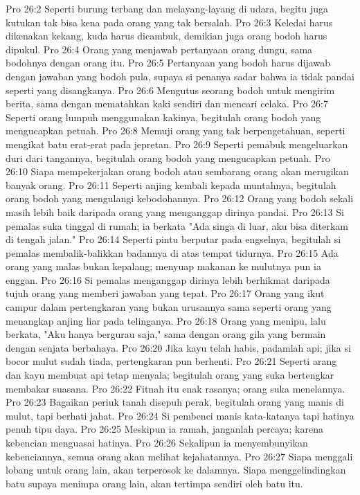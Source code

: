 Pro 26:2  Seperti burung terbang dan melayang-layang di udara, begitu juga kutukan tak bisa kena pada orang yang tak bersalah.
Pro 26:3  Keledai harus dikenakan kekang, kuda harus dicambuk, demikian juga orang bodoh harus dipukul.
Pro 26:4  Orang yang menjawab pertanyaan orang dungu, sama bodohnya dengan orang itu.
Pro 26:5  Pertanyaan yang bodoh harus dijawab dengan jawaban yang bodoh pula, supaya si penanya sadar bahwa ia tidak pandai seperti yang disangkanya.
Pro 26:6  Mengutus seorang bodoh untuk mengirim berita, sama dengan mematahkan kaki sendiri dan mencari celaka.
Pro 26:7  Seperti orang lumpuh menggunakan kakinya, begitulah orang bodoh yang mengucapkan petuah.
Pro 26:8  Memuji orang yang tak berpengetahuan, seperti mengikat batu erat-erat pada jepretan.
Pro 26:9  Seperti pemabuk mengeluarkan duri dari tangannya, begitulah orang bodoh yang mengucapkan petuah.
Pro 26:10  Siapa mempekerjakan orang bodoh atau sembarang orang akan merugikan banyak orang.
Pro 26:11  Seperti anjing kembali kepada muntahnya, begitulah orang bodoh yang mengulangi kebodohannya.
Pro 26:12  Orang yang bodoh sekali masih lebih baik daripada orang yang menganggap dirinya pandai.
Pro 26:13  Si pemalas suka tinggal di rumah; ia berkata "Ada singa di luar, aku bisa diterkam di tengah jalan."
Pro 26:14  Seperti pintu berputar pada engselnya, begitulah si pemalas membalik-balikkan badannya di atas tempat tidurnya.
Pro 26:15  Ada orang yang malas bukan kepalang; menyuap makanan ke mulutnya pun ia enggan.
Pro 26:16  Si pemalas menganggap dirinya lebih berhikmat daripada tujuh orang yang memberi jawaban yang tepat.
Pro 26:17  Orang yang ikut campur dalam pertengkaran yang bukan urusannya sama seperti orang yang menangkap anjing liar pada telinganya.
Pro 26:18  Orang yang menipu, lalu berkata, "Aku hanya bergurau saja," sama dengan orang gila yang bermain dengan senjata berbahaya.
Pro 26:20  Jika kayu telah habis, padamlah api; jika si bocor mulut sudah tiada, pertengkaran pun berhenti.
Pro 26:21  Seperti arang dan kayu membuat api tetap menyala; begitulah orang yang suka bertengkar membakar suasana.
Pro 26:22  Fitnah itu enak rasanya; orang suka menelannya.
Pro 26:23  Bagaikan periuk tanah disepuh perak, begitulah orang yang manis di mulut, tapi berhati jahat.
Pro 26:24  Si pembenci manis kata-katanya tapi hatinya penuh tipu daya.
Pro 26:25  Meskipun ia ramah, janganlah percaya; karena kebencian menguasai hatinya.
Pro 26:26  Sekalipun ia menyembunyikan kebenciannya, semua orang akan melihat kejahatannya.
Pro 26:27  Siapa menggali lobang untuk orang lain, akan terperosok ke dalamnya. Siapa menggelindingkan batu supaya menimpa orang lain, akan tertimpa sendiri oleh batu itu.
